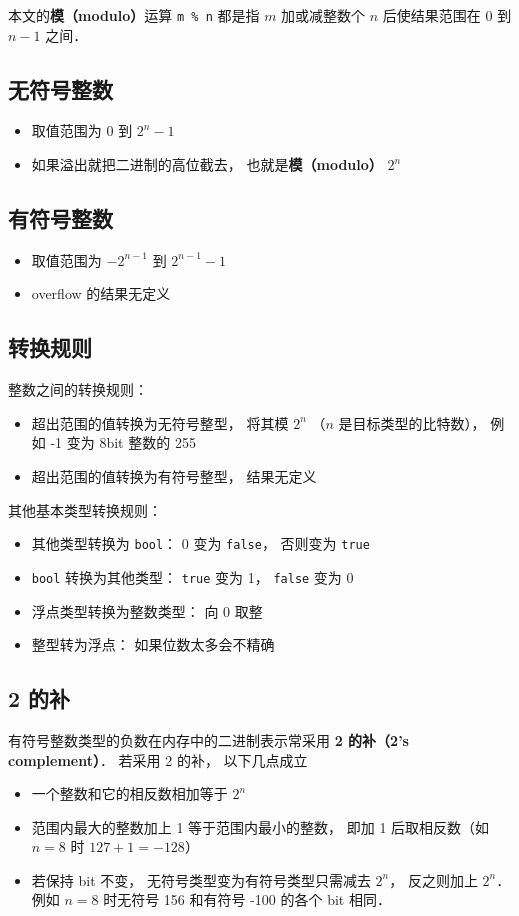 
本文的\textbf{模（modulo）}运算 \verb|m % n| 都是指 $m$ 加或减整数个 $n$ 后使结果范围在 $0$ 到 $n-1$ 之间．

\subsection{无符号整数}
\begin{itemize}
\item 取值范围为 $0$ 到 $2^n-1$
\item 如果溢出就把二进制的高位截去， 也就是\textbf{模（modulo）} $2^n$
\end{itemize}

\subsection{有符号整数}
\begin{itemize}
\item 取值范围为 $-2^{n-1}$ 到 $2^{n-1}-1$
\item overflow 的结果无定义
\end{itemize}

\subsection{转换规则}
整数之间的转换规则：
\begin{itemize}
\item 超出范围的值转换为无符号整型， 将其模 $2^n$ （$n$ 是目标类型的比特数）， 例如 -1 变为 8bit 整数的 255
\item 超出范围的值转换为有符号整型， 结果无定义
\end{itemize}
其他基本类型转换规则：
\begin{itemize}
\item 其他类型转换为 \verb|bool|： 0 变为 \verb|false|， 否则变为 \verb|true|
\item \verb|bool| 转换为其他类型： \verb|true| 变为 1， \verb|false| 变为 0
\item 浮点类型转换为整数类型： 向 0 取整
\item 整型转为浮点： 如果位数太多会不精确
\end{itemize}

\subsection{2 的补}
有符号整数类型的负数在内存中的二进制表示常采用 \textbf{2 的补（2's complement）}． 若采用 2 的补， 以下几点成立
\begin{itemize}
\item 一个整数和它的相反数相加等于 $2^n$
\item 范围内最大的整数加上 1 等于范围内最小的整数， 即加 1 后取相反数（如 $n = 8$ 时 $127 + 1 = -128$）
\item 若保持 bit 不变， 无符号类型变为有符号类型只需减去 $2^n$， 反之则加上 $2^n$． 例如 $n = 8$ 时无符号 156 和有符号 -100 的各个 bit 相同．
\end{itemize}

